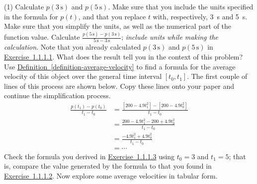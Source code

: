 \documentclass[12pt,]{book}
\theoremstyle{plain}
\theoremstyle{definition}
\theoremstyle{definition}
\theoremstyle{definition}
\theoremstyle{definition}
\theoremstyle{definition}
\numberwithin{equation}{section}
\newlength{\panelmax}
\newcommand{\fe}[2]{#1\mathopen{}\left(#2\right)\mathclose{}}
\newcommand{\cinterval}[2]{\left[#1,#2\right]}
\begin{document}
\begin{exercisegroup}(1)
\exercise[1.]\hypertarget{exercise-calculate-position}{}Calculate \(\fe{p}{3\,\text{s}}\) and \(\fe{p}{5\,\text{s}}\). Make sure that you include the units specified in the formula for \(\fe{p}{t}\), and that you replace \(t\) with, respectively, \SI{3}{\second} and \SI{5}{\second}. Make sure that you simplify the units, as well as the numerical part of the function value.%
\exercise[2.]\hypertarget{exercise-average-velocity}{}Calculate \(\frac{\fe{p}{5\,\text{s}}-\fe{p}{3\,\text{s}}}{{5\,\text{s}}-{3\,\text{s}}}\); \emph{include units while making the calculation}. Note that you already calculated \(\fe{p}{3\,\text{s}}\) and \(\fe{p}{5\,\text{s}}\) in \hyperlink{exercise-calculate-position}{Exercise~1.1.1.1}. What does the result tell you in the context of this problem?%
\exercise[3.]\hypertarget{exercise-average-velocity-formula}{}Use \hyperref[definition-average-velocity]{Definition~\ref{definition-average-velocity}} to find a formula for the average velocity of this object over the general time interval \(\cinterval{t_0}{t_1}\). The first couple of lines of this process are shown below. Copy these lines onto your paper and continue the simplification process.\begin{align*}
\frac{\fe{p}{t_1}-\fe{p}{t_0}}{t_1-t_0}&=\frac{\left[200-4.9t_1^2\right]-\left[200-4.9t_0^2\right]}{t_1-t_0}\\
&=\frac{200-4.9t_1^2-200+4.9t_0^2}{t_1-t_0}\\
&=\frac{-4.9t_1^2+4.9t_0^2}{t_1-t_0}\\
&=\cdots
\end{align*}%
\exercise[4.]\hypertarget{exercise-4}{}Check the formula you derived in \hyperlink{exercise-average-velocity-formula}{Exercise~1.1.1.3} using \(t_0=3\) and \(t_1=5\); that is, compare the value generated by the formula to that you found in \hyperlink{exercise-average-velocity}{Exercise~1.1.1.2}.%
\exercise[5.]\hypertarget{exercise-5}{}Now explore some average velocities in tabular form.%
{%
\setlength{\panelmax}{0pt}
\newsavebox{\panelboxEparagraphs}
}
\end{exercisegroup}
\end{document}
